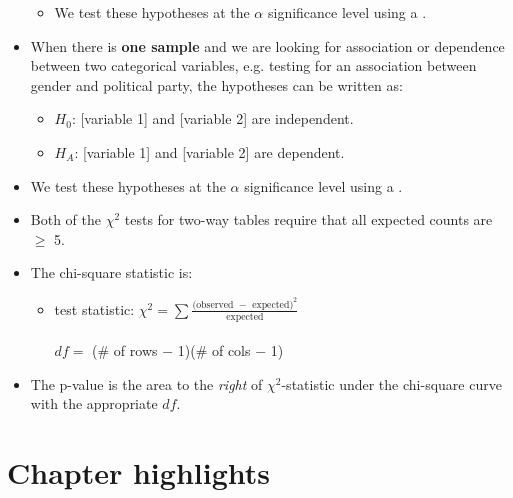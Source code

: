 \begin{itemize}
\begin{itemize}
\item[] We test these hypotheses at the $\alpha$ significance level using a .
\end{itemize}
\item When there is \textbf{one sample} and we are looking for association or dependence between two categorical variables, e.g. testing for an association between gender and political party, the hypotheses can be written as:
\begin{itemize}
\item[] $H_0$:  [variable 1] and [variable 2] are independent.   
\item[]  $H_A$:  [variable 1] and [variable 2] are dependent.
\end{itemize}
\item[] We test these hypotheses at the $\alpha$ significance level using a .
\item Both of the $\chi^2$ tests for two-way tables require that all expected counts are $\ge$ 5.  
\item The chi-square statistic is:
\begin{itemize}
\item[] test statistic:  $\chi^2 =\sum{ \frac{\text{(observed } - \text{ expected})^2}{\text{expected}}}$\\
\\$df =$ (\# of rows $-$ 1)(\# of cols $-$ 1)
\end{itemize}
\item The p-value is the area to the \emph{right} of $\chi^2$-statistic under the chi-square curve with the appropriate $df$.
\end{itemize}


{}


\section*{Chapter highlights}
\setcounter{secnumdepth}{0}
\setcounter{secnumdepth}{2}

